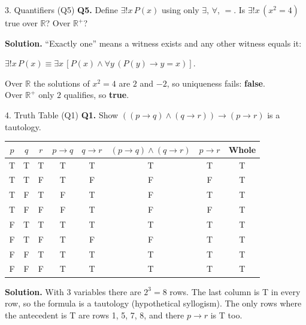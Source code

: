 \documentclass[aspectratio=169,10pt]{beamer}
\newcommand{\qa}[3]{%
  \textbf{Q#1.} #2\par\smallskip
  {\color{ans}\textbf{Solution.} #3}\par\vspace{6pt}}
\begin{document}
\begin{frame}{3. Quantifiers (Q5)}
\footnotesize
\qa{5}{Define $\exists!x\,P(x)$ using only $\exists$, $\forall$, $=$. Is $\exists!x\,(x^2=4)$ true over $\mathbb{R}$? Over $\mathbb{R}^{+}$?}
{``Exactly one'' means a witness exists and any other witness equals it:\\
\centerline{$\exists!x\,P(x)\equiv\exists x\,[P(x)\land\forall y\,(P(y)\to y=x)]$.}
Over $\mathbb{R}$ the solutions of $x^2=4$ are $2$ and $-2$, so uniqueness fails: \textbf{false}.\\
Over $\mathbb{R}^{+}$ only $2$ qualifies, so \textbf{true}.}
\end{frame}

\begin{frame}{4. Truth Table (Q1)}
\footnotesize
\textbf{Q1.} Show $((p\to q)\land(q\to r))\to(p\to r)$ is a tautology.\par\smallskip
\centering
\begin{tabular}{ccc|c|c|c|c|c}
\toprule
$p$&$q$&$r$&$p\to q$&$q\to r$&$(p\to q)\land(q\to r)$&$p\to r$&Whole\\
\midrule
T&T&T&T&T&T&T&T\\
T&T&F&T&F&F&F&T\\
T&F&T&F&T&F&T&T\\
T&F&F&F&T&F&F&T\\
F&T&T&T&T&T&T&T\\
F&T&F&T&F&F&T&T\\
F&F&T&T&T&T&T&T\\
F&F&F&T&T&T&T&T\\
\bottomrule
\end{tabular}\par\smallskip
{\color{ans}\raggedright\textbf{Solution.} With 3 variables there are $2^3=8$ rows. The last column is T in every row, so the formula is a tautology (hypothetical syllogism). The only rows where the antecedent is T are rows 1, 5, 7, 8, and there $p\to r$ is T too.\par}
\end{frame}
\end{document}
